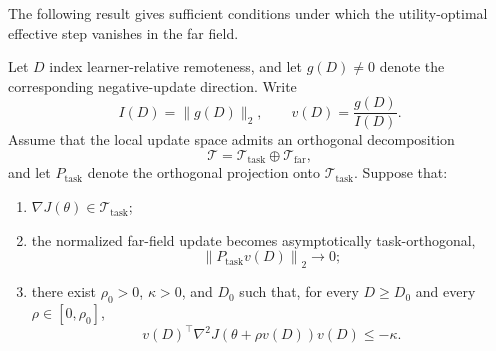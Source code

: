\documentclass[sigconf,anonymous,review]{acmart}
\theoremstyle{acmdefinition}
\begin{document}
The following result gives sufficient conditions under which the
utility-optimal effective step vanishes in the far field.

\begin{lemma}
\label{lem:far_field_utility}
Let \(D\) index learner-relative remoteness, and let \(g(D)\neq0\)
denote the corresponding negative-update direction. Write
\begin{equation}
    I(D)
    =
    \|g(D)\|_2,
    \qquad
    v(D)
    =
    \frac{g(D)}{I(D)}.
    \label{eq:far_field_direction}
\end{equation}
Assume that the local update space admits an orthogonal decomposition
\begin{equation}
    \mathcal T
    =
    \mathcal T_{\mathrm{task}}
    \oplus
    \mathcal T_{\mathrm{far}},
    \label{eq:task_far_decomposition}
\end{equation}
and let \(P_{\mathrm{task}}\) denote the orthogonal projection onto
\(\mathcal T_{\mathrm{task}}\). Suppose that:
\begin{enumerate}
    \item \(\nabla J(\theta)\in\mathcal T_{\mathrm{task}}\);

    \item the normalized far-field update becomes asymptotically
    task-orthogonal,
    \begin{equation}
        \left\|
            P_{\mathrm{task}}v(D)
        \right\|_2
        \longrightarrow 0;
        \label{eq:task_projection_vanishes}
    \end{equation}

    \item there exist \(\rho_0>0\), \(\kappa>0\), and \(D_0\) such that,
    for every \(D\geq D_0\) and every \(\rho\in[0,\rho_0]\),
    \begin{equation}
        v(D)^\top
        \nabla^2J
        \!\left(
            \theta+\rho v(D)
        \right)
        v(D)
        \leq
        -\kappa.
        \label{eq:far_field_negative_curvature}
    \end{equation}
\end{enumerate}


\end{lemma}
\end{document}
